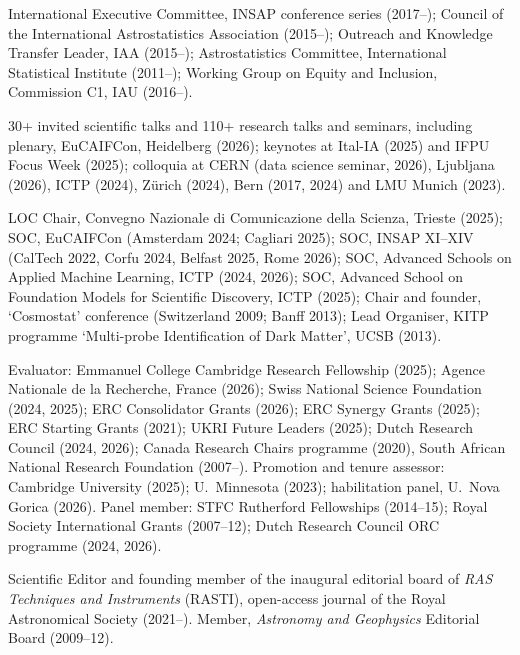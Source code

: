 International Executive Committee, INSAP conference series (2017–); Council of the International Astrostatistics Association (2015–); Outreach and Knowledge Transfer Leader, IAA (2015–); Astrostatistics Committee, International Statistical Institute (2011–); Working Group on Equity and Inclusion, Commission C1, IAU (2016–).

30+ invited scientific talks and 110+ research talks and seminars, including plenary, EuCAIFCon, Heidelberg (2026); keynotes at Ital-IA (2025) and IFPU Focus Week (2025); colloquia at CERN (data science seminar, 2026), Ljubljana (2026), ICTP (2024), Z\"urich (2024), Bern (2017, 2024) and LMU Munich (2023).

LOC Chair, Convegno Nazionale di Comunicazione della Scienza, Trieste (2025); SOC, EuCAIFCon (Amsterdam 2024; Cagliari 2025); SOC, INSAP XI–XIV (CalTech 2022, Corfu 2024, Belfast 2025, Rome 2026); SOC, Advanced Schools on Applied Machine Learning, ICTP (2024, 2026); SOC, Advanced School on Foundation Models for Scientific Discovery, ICTP (2025); Chair and founder, `Cosmostat' conference (Switzerland 2009; Banff 2013); Lead Organiser, KITP programme `Multi-probe Identification of Dark Matter', UCSB (2013).

Evaluator: Emmanuel College Cambridge Research Fellowship (2025); Agence Nationale de la Recherche, France (2026); Swiss National Science Foundation (2024, 2025); ERC Consolidator Grants (2026); ERC Synergy Grants (2025); ERC Starting Grants (2021); UKRI Future Leaders (2025); Dutch Research Council (2024, 2026);  Canada Research Chairs programme (2020), South African National Research Foundation (2007–). 
Promotion and tenure assessor: Cambridge University  (2025); U.~Minnesota (2023); habilitation panel, U.~Nova Gorica (2026).
Panel member: STFC Rutherford Fellowships (2014–15); Royal Society International Grants (2007–12); Dutch Research Council ORC programme (2024, 2026).



Scientific Editor and founding member of the inaugural editorial board of {\itshape RAS Techniques and Instruments} (RASTI), open-access journal of the Royal Astronomical Society (2021–). Member, {\itshape Astronomy and Geophysics} Editorial Board (2009–12).

